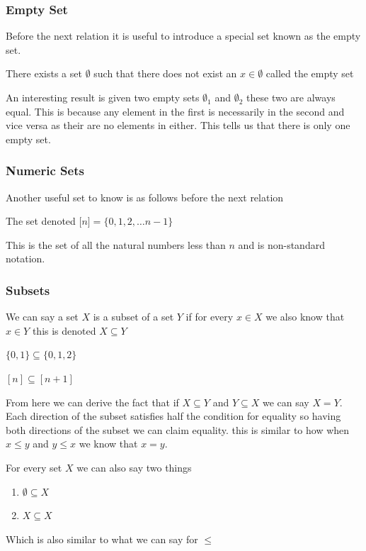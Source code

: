 \documentclass{article}
\begin{document}
\subsubsection{Empty Set}
Before the next relation it is useful to introduce a special set known as the empty set.
\begin{definition}
    There exists a set $\emptyset$ such that there does not exist an $x \in \emptyset$ called the empty set
\end{definition}
An interesting result is given two empty sets $\emptyset_{1}$ and $\emptyset_{2}$ these two are always equal. This is because any element in the first is necessarily in the second and vice versa as their are no elements in either. This tells us that there is only one empty set.

\subsubsection{Numeric Sets}
Another useful set to know is as follows before the next relation
\begin{definition}
    The set denoted $\mathbb{[}n\mathbb{]} = \{0,1,2,\dots n-1\}$
\end{definition}
This is the set of all the natural numbers less than $n$ and is non-standard notation. 
\subsubsection{Subsets}
\begin{definition}
    We can say a set $X$ is a subset of a set $Y$ if for every $x \in X$ we also know that $x \in Y$ this is denoted $X \subseteq Y$
\end{definition}
\begin{example}
    $\{0,1\} \subseteq \{0,1,2\}$
\end{example}
\begin{example}
    $[n] \subseteq [n+1]$
\end{example}

From here we can derive the fact that if $X \subseteq Y$ and $Y \subseteq X$ we can say $X = Y$. Each direction of the subset satisfies half the condition for equality so having both directions of the subset we can claim equality. this is similar to how when $x \le y$ and $y \le x$ we know that $x = y$.

For every set $X$ we can also say two things
\begin{enumerate}
    \item $\emptyset \subseteq X$
    \item $X \subseteq X$
\end{enumerate}
Which is also similar to what we can say for $\le$
\end{document}
